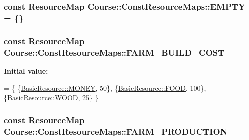 \hypertarget{namespaceCourse_1_1ConstResourceMaps_a4dc4fbb3cbb89f13a967b2101b6b6a17}{
\subsubsection[{E\-M\-P\-T\-Y}]{\setlength{\rightskip}{0pt plus 5cm}const {\bf Resource\-Map} Course\-::\-Const\-Resource\-Maps\-::\-E\-M\-P\-T\-Y = \{\}}}\label{namespaceCourse_1_1ConstResourceMaps_a4dc4fbb3cbb89f13a967b2101b6b6a17}
\hypertarget{namespaceCourse_1_1ConstResourceMaps_a4919571a8aa47de7c6e513de147642ef}{
\subsubsection[{F\-A\-R\-M\-\_\-\-B\-U\-I\-L\-D\-\_\-\-C\-O\-S\-T}]{\setlength{\rightskip}{0pt plus 5cm}const {\bf Resource\-Map} Course\-::\-Const\-Resource\-Maps\-::\-F\-A\-R\-M\-\_\-\-B\-U\-I\-L\-D\-\_\-\-C\-O\-S\-T}}\label{namespaceCourse_1_1ConstResourceMaps_a4919571a8aa47de7c6e513de147642ef}
{\bfseries Initial value\-:}
\begin{DoxyCode}
= \{
    \{\hyperlink{namespaceCourse_a02d49c04029594d4adba79b84bb85f65aff016add6bbbdbb44abf1d2d7f215ec0}{BasicResource::MONEY}, 50\},
    \{\hyperlink{namespaceCourse_a02d49c04029594d4adba79b84bb85f65a7018c47af38bfc1390a89e70b4cf4760}{BasicResource::FOOD}, 100\},
    \{\hyperlink{namespaceCourse_a02d49c04029594d4adba79b84bb85f65a87287be3009253b983ffb2e9f91eef22}{BasicResource::WOOD}, 25\}
\}
\end{DoxyCode}
\hypertarget{namespaceCourse_1_1ConstResourceMaps_ac05142db09e7f1f85c7d936356a35df2}{
\subsubsection[{F\-A\-R\-M\-\_\-\-P\-R\-O\-D\-U\-C\-T\-I\-O\-N}]{\setlength{\rightskip}{0pt plus 5cm}const {\bf Resource\-Map} Course\-::\-Const\-Resource\-Maps\-::\-F\-A\-R\-M\-\_\-\-P\-R\-O\-D\-U\-C\-T\-I\-O\-N}}\label{namespaceCourse_1_1ConstResourceMaps_ac05142db09e7f1f85c7d936356a35df2}
